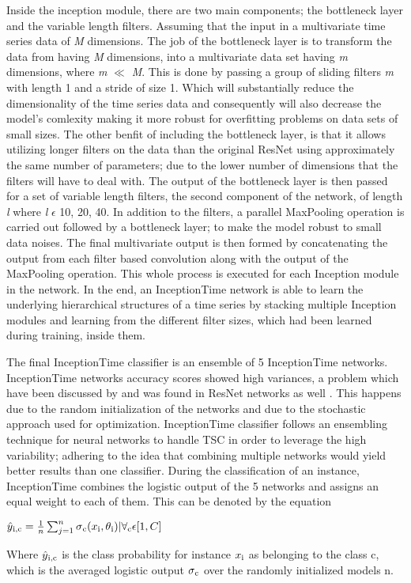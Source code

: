 Inside the inception module, there are two main components; the bottleneck layer and the variable length filters.
Assuming that the input in a multivariate time series data of \emph{M} dimensions. The job of the bottleneck layer is to transform
the data from having \emph{M} dimensions, into a multivariate data set having \emph{m} dimensions, where \emph{m} $\ll$ \emph{M}.
This is done by passing a group of sliding filters \emph{m} with length 1 and a stride of size 1.
Which will substantially reduce the dimensionality of the time series data and consequently will also decrease the model's comlexity
making it more robust for overfitting problems on data sets of small sizes. The other benfit of including the bottleneck layer,
is that it allows utilizing longer filters on the data than the original ResNet using approximately the same number of parameters;
due to the lower number of dimensions that the filters will have to deal with.\newline
The output of the bottleneck layer is then passed for a set of variable length filters, the second component of the network, of length \emph{l}
where \emph{l} $\epsilon$ {10, 20, 40}. In addition to the filters, a parallel MaxPooling operation is carried out followed by a bottleneck layer;
to make the model robust to small data noises. The final multivariate output is then formed by concatenating the output from each filter based convolution
along with the output of the MaxPooling operation. This whole process is executed for each Inception module in the network.\newline
In the end, an InceptionTime network is able to learn the underlying hierarchical structures of a time series by stacking multiple Inception modules
and learning from the different filter sizes, which had been learned during training, inside them.

The final InceptionTime classifier is an ensemble of 5 InceptionTime networks.
InceptionTime networks accuracy scores showed high variances, a problem which have been discussed by \cite{scardapane2017randomness} and was found in ResNet networks as well \cite{fawaz2019deep}.
This happens due to the random initialization of the networks and due to the stochastic approach used for optimization.
InceptionTime classifier follows an ensembling technique for neural networks to handle TSC \cite{fawaz2019deep} in order to leverage the high variability;
adhering to the idea that combining multiple networks would yield better results than one classifier.
During the classification of an instance, InceptionTime combines the logistic output of the 5 networks and assigns an equal weight to each of them.
This can be denoted by the equation
\begin{definition}
    $\hat{y}\textsubscript{i,c} = \frac{1}{n} \sum_{j = 1}^{n} \sigma\textsubscript{c} (x\textsubscript{i}, \theta\textsubscript{i}) | \forall\textsubscript{c} \epsilon [1,C]$
\end{definition}
Where $\hat{y}\textsubscript{i,c}$ is the class probability for instance $x\textsubscript{i}$ as belonging to the class c,
which is the averaged logistic output $\sigma\textsubscript{c}$ over the randomly initialized models n.